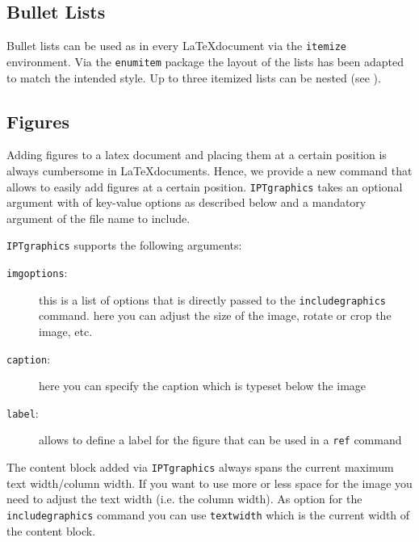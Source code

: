 
\subsection{Bullet Lists}

Bullet lists can be used as in every \LaTeX document via the \texttt{itemize} environment. Via the \texttt{enumitem} package the layout of the lists has been adapted to match the intended style. Up to three itemized lists can be nested (see ).



\subsection{Figures}

Adding figures to a latex document and placing them at a certain position is always cumbersome in \LaTeX documents. Hence, we provide a new command \texttt{} that allows to easily add figures at a certain position. 
\texttt{IPTgraphics} takes an optional argument with of key-value options as described below and a mandatory argument of the file name to include.

\texttt{IPTgraphics} supports the following arguments:
\begin{description}
	\item[\texttt{imgoptions}:] this is a list of options that is directly passed to the \texttt{\bs{}includegraphics} command. here you can adjust the size of the image, rotate or crop the image, etc.
	\item[\texttt{caption}:] here you can specify the caption which is typeset below the image
	\item[\texttt{label}:] allows to define a label for the figure that can be used in a \texttt{\bs{}ref} command
\end{description}

The content block added via \texttt{IPTgraphics} always spans the current maximum text width/column width. If you want to use more or less space for the image you need to adjust the text width (i.e. the column width). As option for the \texttt{includegraphics} command you can use \texttt{\bs{}textwidth} which is the current width of the content block.

